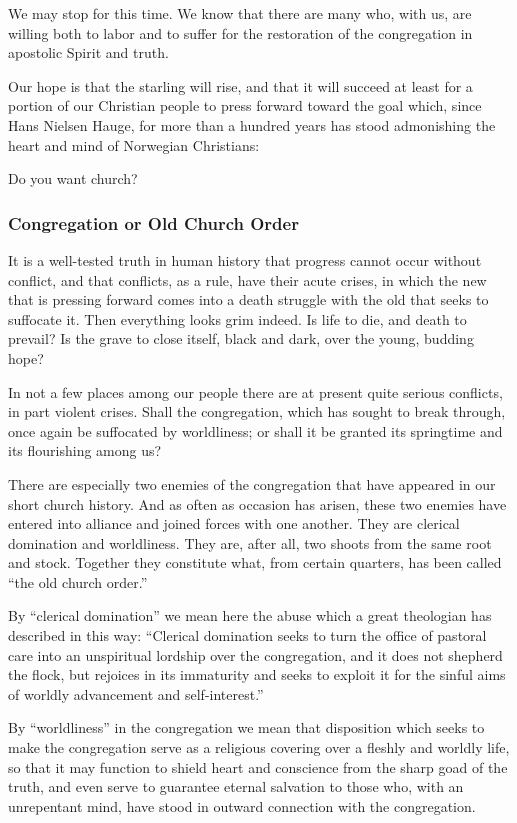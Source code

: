 We may stop for this time. We know that there are many who, with us, are willing both to labor and to suffer for the restoration of the congregation in apostolic Spirit and truth.

Our hope is that the starling will rise, and that it will succeed at least for a portion of our Christian people to press forward toward the goal which, since Hans Nielsen Hauge, for more than a hundred years has stood admonishing the heart and mind of Norwegian Christians:

Do you want church?

\subsubsection{Congregation or Old Church Order}

It is a well-tested truth in human history that progress cannot occur without conflict, and that conflicts, as a rule, have their acute crises, in which the new that is pressing forward comes into a death struggle with the old that seeks to suffocate it. Then everything looks grim indeed. Is life to die, and death to prevail? Is the grave to close itself, black and dark, over the young, budding hope?

In not a few places among our people there are at present quite serious conflicts, in part violent crises. Shall the congregation, which has sought to break through, once again be suffocated by worldliness; or shall it be granted its springtime and its flourishing among us?

There are especially two enemies of the congregation that have appeared in our short church history. And as often as occasion has arisen, these two enemies have entered into alliance and joined forces with one another. They are clerical domination and worldliness. They are, after all, two shoots from the same root and stock. Together they constitute what, from certain quarters, has been called “the old church order.”

By “clerical domination” we mean here the abuse which a great theologian has described in this way: “Clerical domination seeks to turn the office of pastoral care into an unspiritual lordship over the congregation, and it does not shepherd the flock, but rejoices in its immaturity and seeks to exploit it for the sinful aims of worldly advancement and self-interest.”

By “worldliness” in the congregation we mean that disposition which seeks to make the congregation serve as a religious covering over a fleshly and worldly life, so that it may function to shield heart and conscience from the sharp goad of the truth, and even serve to guarantee eternal salvation to those who, with an unrepentant mind, have stood in outward connection with the congregation.

